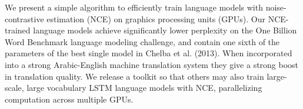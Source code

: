 We present a simple algorithm to efficiently train language models with noise-contrastive estimation (NCE) on graphics processing units (GPUs). Our NCE-trained language models achieve significantly lower perplexity on the One Billion Word Benchmark language modeling challenge, and contain one sixth of the parameters of the best single model in Chelba et al. (2013). When incorporated into a strong Arabic-English machine translation system they give a strong boost in translation quality. We release a toolkit so that others may also train large-scale, large vocabulary LSTM language models with NCE, parallelizing computation across multiple GPUs.
